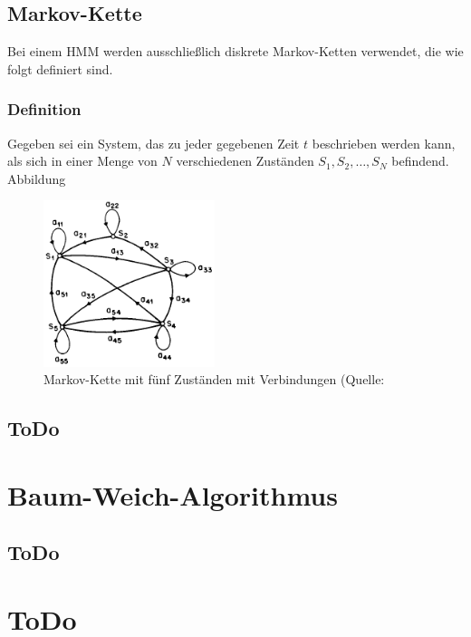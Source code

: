 \subsection{Markov-Kette}
\label{subsec:MarkovKette}
Bei einem \acrshort{HMM} werden ausschlie\ss lich diskrete Markov-Ketten verwendet, die wie folgt definiert sind.

\subsubsection{Definition}
Gegeben sei ein System, das zu jeder gegebenen Zeit $t$ beschrieben werden kann, als sich in einer Menge von $N$ verschiedenen Zust\"anden
$S_1, S_2, \ldots, S_N$ befindend. Abbildung 

\begin{figure}[htb]
\centering
\includegraphics[width=5cm]{img/markov/markov_chain.png}
\caption[Markov-Kette mit f\"unf Zust\"anden]{Markov-Kette mit f\"unf Zust\"anden  mit Verbindungen (Quelle: }
\label{fig:MarkovKette}
\end{figure}

\subsection{}

\subsection{ToDo}

\section{Baum-Weich-Algorithmus}

\subsection{ToDo}

\section{ToDo}
